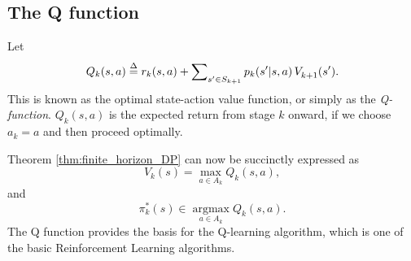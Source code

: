 \subsection{The Q function}
Let
\[{Q_k}(s,a) \buildrel \Delta \over = {r_k}(s,a) + \sum\nolimits_{s' \in {S_{k+1}}} {{p_k}(s'|s,a)\,V_{k+1}^{}(s')} .\]
This is known as the optimal state-action value function, or simply as the \emph{Q-function}. ${Q_k}(s,a)$ is the expected return from stage $k$ onward, if we choose ${a_k} = a$  and then proceed optimally.

Theorem \ref{thm:finite_horizon_DP} can now be succinctly expressed as
\[V_k^{}(s) = \mathop {\max }\limits_{a \in {A_k}} {Q_k}(s,a),\]
and
\[\pi _k^*(s) \in \mathop {\arg \max }\limits_{a \in {A_k}} {Q_k}(s,a).\]
The Q function provides the basis for the Q-learning algorithm, which is one of the basic Reinforcement Learning algorithms.



